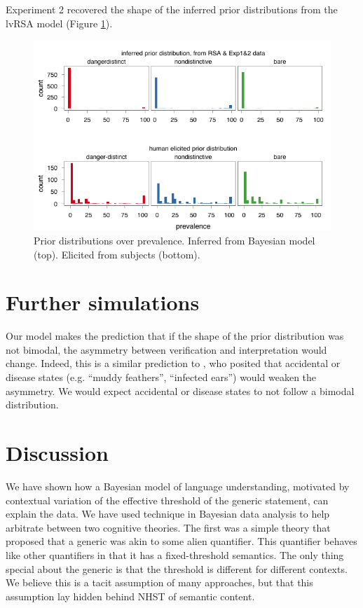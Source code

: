 \documentclass[10pt,letterpaper]{article}
\begin{document}
Experiment 2 recovered the shape of the inferred prior distributions from the lvRSA model (Figure \ref{fig:modeldatapriors}).

\begin{figure}
\centering
    \includegraphics[width=\columnwidth]{exp3hist_inferredMeanPriorExp1_2}
    \caption{Prior distributions over prevalence. Inferred from Bayesian model (top). Elicited from subjects (bottom).}
  \label{fig:modeldatapriors}
\end{figure}


\section{Further simulations}

Our model makes the prediction that if the shape of the prior distribution was not bimodal, the asymmetry between verification and interpretation would change. Indeed, this is a similar prediction to , who posited that accidental or disease states (e.g. ``muddy feathers'', ``infected ears'') would weaken the asymmetry. We would expect accidental or disease states to not follow a bimodal distribution. 
 

\section{Discussion}

We have shown how a Bayesian model of language understanding, motivated by contextual variation of the effective threshold of the generic statement, can explain the data. We have used technique in Bayesian data analysis to help arbitrate between two cognitive theories. The first was a simple theory that proposed that a generic was akin to some alien quantifier. This quantifier behaves like other quantifiers in that it has a fixed-threshold semantics. The only thing special about the generic is that the threshold is different for different contexts. We believe this is a tacit assumption of many approaches, but that this assumption lay hidden behind NHST of semantic content.
\end{document}
